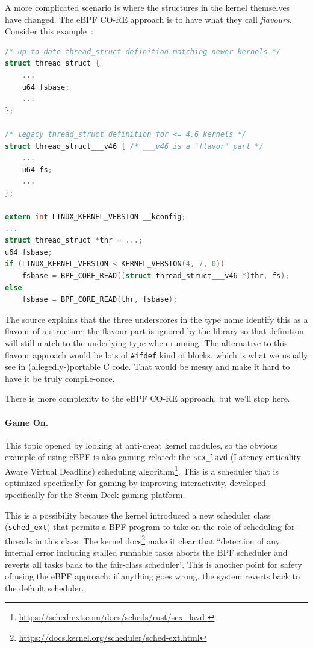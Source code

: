 A more complicated scenario is where the structures in the kernel themselves have changed. The eBPF CO-RE approach is to have what they call \textit{flavours}. Consider this example~\cite{ebpf-co-re}:

\begin{lstlisting}[language=C]
/* up-to-date thread_struct definition matching newer kernels */
struct thread_struct {
    ...
    u64 fsbase;
    ...
};

/* legacy thread_struct definition for <= 4.6 kernels */
struct thread_struct___v46 { /* ___v46 is a "flavor" part */
    ...
    u64 fs;
    ...
};

extern int LINUX_KERNEL_VERSION __kconfig;
...
struct thread_struct *thr = ...;
u64 fsbase;
if (LINUX_KERNEL_VERSION < KERNEL_VERSION(4, 7, 0))
    fsbase = BPF_CORE_READ((struct thread_struct___v46 *)thr, fs);
else
    fsbase = BPF_CORE_READ(thr, fsbase);
\end{lstlisting}

The source explains that the three underscores in the type name identify this as a flavour of a structure; the flavour part is ignored by the library so that definition will still match to the underlying type when running. The alternative to this flavour approach would be lots of \texttt{\#ifdef} kind of blocks, which is what we usually see in (allegedly-)portable C code. That would be messy and make it hard to have it be truly compile-once.

There is more complexity to the eBPF CO-RE approach, but we'll stop here. 

\paragraph{Game On.} This topic opened by looking at anti-cheat kernel modules, so the obvious example of using eBPF is also gaming-related: the \texttt{scx\_lavd} (Latency-criticality Aware Virtual Deadline) scheduling algorithm\footnote{ \url{ https://sched-ext.com/docs/scheds/rust/scx_lavd } }. This is a scheduler that is optimized specifically for gaming by improving interactivity, developed specifically for the Steam Deck gaming platform.

This is a possibility because the kernel introduced a new scheduler class (\texttt{sched\_ext}) that permits a BPF program to take on the role of scheduling for threads in this class. The kernel docs\footnote{ \url{https://docs.kernel.org/scheduler/sched-ext.html} } make it clear that ``detection of any internal error including stalled runnable tasks aborts the BPF scheduler and reverts all tasks back to the fair-class scheduler''. This is another point for safety of using the eBPF approach: if anything goes wrong, the system reverts back to the default scheduler.

